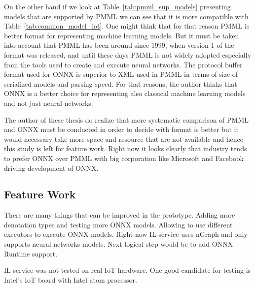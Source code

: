 \documentclass[english, 12pt, a4paper, elec, utf8, online]{aaltothesis}
\begin{document}
On the other hand if we look at Table~\ref{tab:pmml_sup_models} presenting models that are supported by PMML we can see that it is more compatible with Table~\ref{tab:common_model_iot}. One might think that for that reason PMML is better format for representing machine learning models. But it must be taken into account that PMML has been around since 1999, when version 1 of the format was released, and until these days PMML is not widely adopted especially from the tools used to create and execute neural networks. The protocol buffer format used for ONNX is superior to XML used in PMML in terms of size of serialized models and parsing speed. For that reasons, the author thinks that ONNX is a better choice for representing also classical machine learning models and not just neural networks. 

The author of these thesis do realize that more systematic comparison of PMML and ONNX must be conducted in order to decide with format is better but it would necessary take more space and resource that are not available and hence this study is left for feature work. Right now it looks clearly that industry tends to prefer ONNX over PMML with big corporation like Microsoft and Facebook driving development of ONNX.

\subsection{Feature Work}   
There are many things that can be improved in the prototype. Adding more denotation types and testing more ONNX models. Allowing to use different executors to execute  ONNX models. Right now IL service uses nGraph and only supports neural networks models. Next logical step would be to add ONNX Runtime support. 

IL service was not tested on real IoT hardware. One good candidate for testing is Intel's IoT board with Intel atom processor. 

\end{document}
